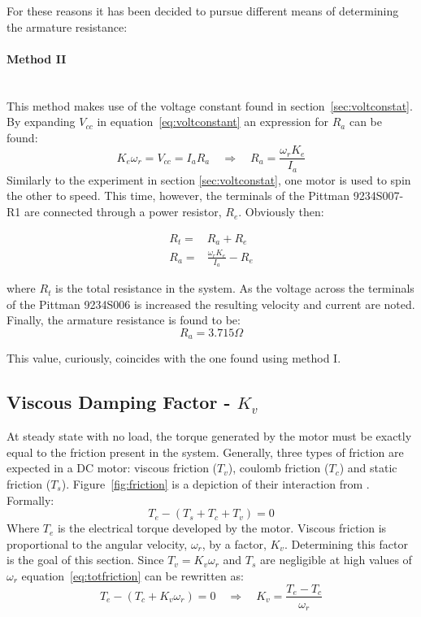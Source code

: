 For these reasons it has been decided to pursue different means of determining the armature resistance:
\paragraph{Method II}~\\
This method makes use of the voltage constant found in section~\ref{sec:voltconstat}.
By expanding $V_{cc}$ in equation~\ref{eq:voltconstant} an expression for $R_a$ can be found:
\begin{equation}
	\label{eq:voltconstantexpanded}
	K_e\omega_r = V_{cc} = I_aR_a\quad \Rightarrow \quad R_a = \frac{\omega_rK_e}{I_a}
\end{equation}
Similarly to the experiment in section \ref{sec:voltconstat}, one motor is used to spin the other to speed.
This time, however, the terminals of the Pittman 9234S007-R1 are connected through a power resistor, $R_e$.
Obviously then:

\begin{eqnarray}
	R_t =& R_a + R_e\\
	R_a =& \frac{\omega_rK_e}{I_a}-R_e
\end{eqnarray}

where $R_t$ is the total resistance in the system.
As the voltage across the terminals of the Pittman 9234S006 is increased the resulting velocity and current are noted.
Finally, the armature resistance is found to be:
$$R_a = 3.715\Omega$$

This value, curiously, coincides with the one found using method I.

\subsection{Viscous Damping Factor - $K_v$}
\label{sec:viscous}
At steady state with no load, the torque generated by the motor must be exactly equal to the friction present in the system.
Generally, three types of friction are expected in a DC motor: viscous friction ($T_v$), coulomb friction ($T_c$) and static friction ($T_s$).
Figure~\ref{fig:friction} is a depiction of their interaction from \cite{feedback}.
Formally:
\begin{equation}
	\label{eq:totfriction}
	T_e-(T_s+T_c+T_v)=0
\end{equation}
Where $T_e$ is the electrical torque developed by the motor.
Viscous friction is proportional to the angular velocity, $\omega_r$, by a factor, $K_v$.
Determining this factor is the goal of this section.
Since $T_v=K_v\omega_r$ and $T_s$ are negligible at high values of $\omega_r$ equation~\ref{eq:totfriction} can be rewritten as:
\begin{equation}
	\label{eq:frictionnostatic}
	T_e-(T_c+K_v\omega_r)=0 \quad \Rightarrow \quad K_v = \frac{T_e-T_c}{\omega_r}
\end{equation}

